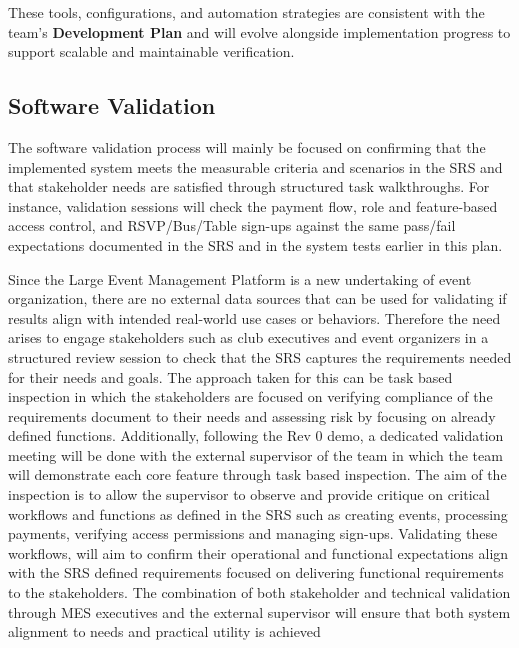\documentclass[12pt, titlepage]{article}
\begin{document}
These tools, configurations, and automation strategies are consistent with the team’s \textbf{Development Plan} and will evolve alongside implementation progress to support scalable and maintainable verification.

\subsection{Software Validation}
The software validation process will mainly be focused on confirming that the implemented system meets the measurable criteria and scenarios in the SRS and that stakeholder needs are satisfied through structured task walkthroughs. For instance, validation sessions will check the payment flow, role and feature-based access control, and RSVP/Bus/Table sign-ups against the same pass/fail expectations documented in the SRS and in the system tests earlier in this plan. 

Since the Large Event Management Platform is a new undertaking of event organization, there are no external data sources that can be used for validating if results align with intended real-world use cases or behaviors. Therefore the need arises to engage stakeholders such as club executives and event organizers in a structured review session to check that the SRS captures the requirements needed for their needs and goals. The approach taken for this can be task based inspection in which the stakeholders are focused on verifying compliance of the requirements document to their needs and assessing risk by focusing on already defined functions. Additionally, following the Rev 0 demo, a dedicated validation meeting will be done with the external supervisor of the team in which the team will demonstrate each core feature through task based inspection. The aim of the inspection is to allow the supervisor to observe and provide critique on critical workflows and functions as defined in the SRS such as creating events, processing payments, verifying access permissions and managing sign-ups. Validating these workflows, will aim to confirm their operational and functional expectations align with the SRS defined requirements focused on delivering functional requirements to the stakeholders. The combination of both stakeholder and technical validation through MES executives and the external supervisor will ensure that both system alignment to needs and practical utility is achieved
\end{document}
